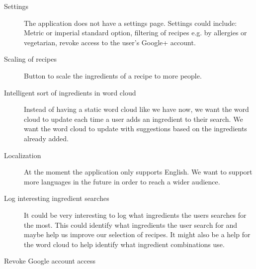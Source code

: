 \begin{description}
\item[Settings] The application does not have a settings page. Settings could include: Metric or imperial standard option, filtering of recipes e.g. by allergies or vegetarian, revoke access to the user's Google+ account.

\item[Scaling of recipes] Button to scale the ingredients of a recipe to more people.

\item [Intelligent sort of ingredients in word cloud] Instead of having a static word cloud like we have now, we want the word cloud to update each time a user adds an ingredient to their search. We want the word cloud to update with suggestions based on the ingredients already added. 

\item [Localization] At the moment the application only supports English. We want to support more languages in the future in order to reach a wider audience.
\item [Log interesting ingredient searches] It could be very interesting to log what ingredients the users searches for the most. This could identify what ingredients the user search for and maybe help us improve our selection of recipes. It might also be a help for the word cloud to help identify what ingredient combinations use.
\item [Revoke Google account access]

\end{description}
